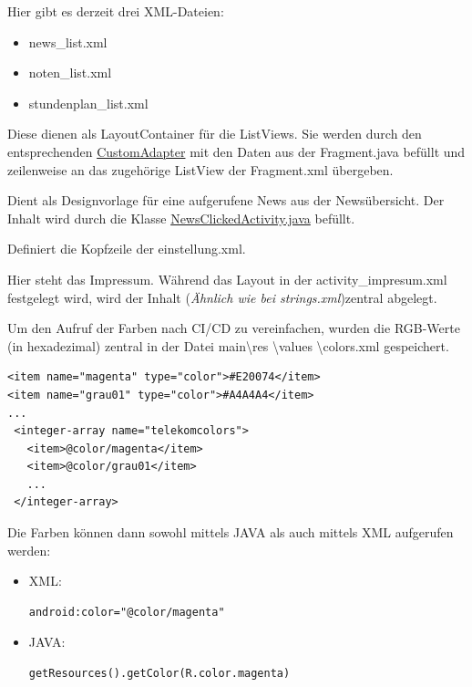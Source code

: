 \begin{description}
Hier gibt es derzeit drei XML-Dateien:
\begin{itemize}
\item news\_list.xml
\item noten\_list.xml
\item stundenplan\_list.xml
\end{itemize}

Diese dienen als LayoutContainer für die ListViews. Sie werden durch den entsprechenden \hyperref[CustomAdapter]{CustomAdapter} mit den Daten aus der Fragment.java befüllt und zeilenweise an das zugehörige ListView der Fragment.xml übergeben.

Dient als Designvorlage für eine aufgerufene News aus der Newsübersicht. Der Inhalt wird durch die Klasse \hyperref[NewsClickedActivity]{NewsClickedActivity.java} befüllt.

Definiert die Kopfzeile der einstellung.xml.

Hier steht das Impressum. Während das Layout in der activity\_impresum.xml festgelegt wird, wird der Inhalt (\textit{\"Ahnlich wie bei strings.xml})zentral abgelegt.

Um den Aufruf der Farben nach CI/CD zu vereinfachen, wurden die RGB-Werte (in hexadezimal) zentral in der Datei main\textbackslash res \textbackslash values \textbackslash colors.xml gespeichert.
\lstset{language=XML}
\begin{lstlisting}
<item name="magenta" type="color">#E20074</item>
<item name="grau01" type="color">#A4A4A4</item>
...
 <integer-array name="telekomcolors">
   <item>@color/magenta</item>
   <item>@color/grau01</item>
   ...
 </integer-array>
\end{lstlisting}
Die Farben können dann sowohl mittels JAVA als auch mittels XML aufgerufen werden:
\begin{itemize}
\item XML:
\begin{lstlisting}
android:color="@color/magenta"
\end{lstlisting}
\item JAVA:
\lstset{language=JAVA}
\begin{lstlisting}
getResources().getColor(R.color.magenta)
\end{lstlisting}
\end{itemize}




\end{description}
